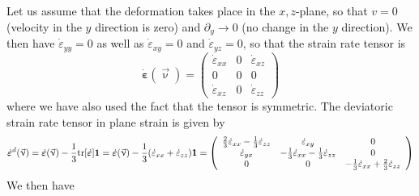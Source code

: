 \documentclass[a4paper,12pt]{article}
\begin{document}
Let us assume that the deformation takes place in the $x,z$-plane,
so that $v=0$ (velocity in the $y$ direction is zero) and $\partial_y \rightarrow 0$ 
(no change in the $y$ direction).
We then have $\dot{\varepsilon}_{yy}=0$ as well as $\dot{\varepsilon}_{xy}=0$ 
and $\dot{\varepsilon}_{yz}=0$, so that the strain rate tensor is  
\[
\dot{\bm \varepsilon}(\vec\upnu)=
\left( \begin{array}{ccc}
\dot{\varepsilon}_{xx} & 0 & \dot{\varepsilon}_{xz} \\
0 & 0 & 0  \\
\dot{\varepsilon}_{xz} & 0 & \dot{\varepsilon}_{zz} 
\end{array}\right)
\]
where we have also used the fact that the tensor is symmetric.
The deviatoric strain rate tensor in plane strain is given by
\[
\dot{\bm \varepsilon}^d(\vec\upnu) 
= \dot{\bm \varepsilon}(\vec\upnu) -\frac{1}{3} {\rm tr}[\dot{\bm \varepsilon}]   {\bm 1} 
= \dot{\bm \varepsilon}(\vec\upnu) -\frac{1}{3} (\dot{\varepsilon}_{xx} +\dot{\varepsilon}_{zz}   )  {\bm 1} 
=
\left(
\begin{array}{ccc}
\frac{2}{3}\dot{\varepsilon}_{xx} -\frac{1}{3}\dot{\varepsilon}_{zz} & \dot{\varepsilon}_{xy} & 0 \\
\dot{\varepsilon}_{yx} & -\frac{1}{3} \dot{\varepsilon}_{xx} -\frac{1}{3}\dot{\varepsilon}_{zz} & 0 \\
0 & 0 & -\frac{1}{3}\dot{\varepsilon}_{xx} +\frac{2}{3} \dot{\varepsilon}_{zz} 
\end{array}
\right)
\]
We then have
\end{document}
